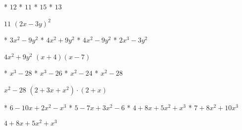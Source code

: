 \begin{enum}
	* $12$
	* $11$
	* $15$
	* $13$
\end{enum}
$11$
$(2x-3y)^2$
\begin{enum}
	* $3x^2-9y^2$
	* $4x^2+9y^2$
	* $4x^2-9y^2$
	* $2x^3-3y^2$
\end{enum}
$4x^2+9y^2$
$(x+4)(x-7)$
\begin{enum}
	* $x^3-28$
	* $x^3-26$
	* $x^2-24$
	* $x^2-28$
\end{enum}
$x^2-28$
$\left(2+3x+x^2\right)\cdot(2+x)$
\begin{enum}
	* $6-10x+2x^2-x^3$
	* $5-7x+3x^2-6$
	* $4+8x+5x^2+x^3$
	* $7+8x^2+10x^3$
\end{enum}
$4+8x+5x^2+x^3$

